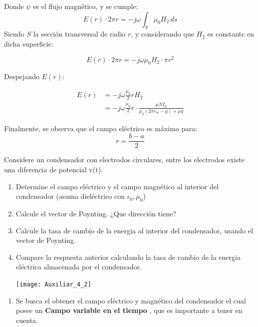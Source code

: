 \documentclass[
  11pt,
  letterpaper,
   addpoints,
   answers
  ]{exam}
\begin{document}
\begin{questions}
\begin{solution}
\begin{enumerate}
\noindent
Donde \( \psi \) es el flujo magnético, y se cumple:
\begin{equation}
E(r) \cdot 2\pi r = -j\omega \int_S \mu_0 H_2 \, ds
\end{equation}
Siendo \( S \) la sección transversal de radio \( r \), y considerando que \( H_2 \) es constante en dicha superficie:

\begin{equation}
E(r) \cdot 2\pi r = -j\omega \mu_0 H_2 \cdot \pi r^2
\end{equation}

Despejando \( E(r) \):

\begin{align}
E(r) &= -j\omega \frac{\mu_0}{2} r H_2 \\
&= -j\omega \frac{\mu_0}{2} r \cdot \frac{\mu N I_0}{\mu_0(2\pi r_m - g) + \mu g}
\end{align}

Finalmente, se observa que el campo eléctrico es máximo para:
\begin{equation}
r = \frac{b - a}{2}
\end{equation}

\end{enumerate}
    \end{solution}
    \question  Considere un condensador con electrodos circulares, entre los electrodos existe una diferencia de potencial
    v(t).
    \begin{enumerate}
        \item Determine el campo eléctrico y el campo magnético al interior del condensador (asuma dieléctrico con $\epsilon_{0}, \mu_{0}$)
        \item Calcule el vector de Poynting. ¿Que dirección tiene?
        \item  Calcule la tasa de cambio de la energia al interior del condensador, usando el vector de Poynting.
        \item Compare la respuesta anterior calculando la tasa de cambio de la energia eléctrica almacenada por el
    condensador.
    \begin{center}
        \texttt{[image: Auxiliar\_4\_2]}
      \end{center}
    \end{enumerate}
    \begin{solution}
         \begin{enumerate}
            \item Se busca el obtener el campo eléctrico y magnético del condensador el cual posee un \textbf{Campo variable en el tiempo} , que es importante a tener en cuenta.\\

\end{enumerate}
\end{solution}
\end{questions}
\end{document}
